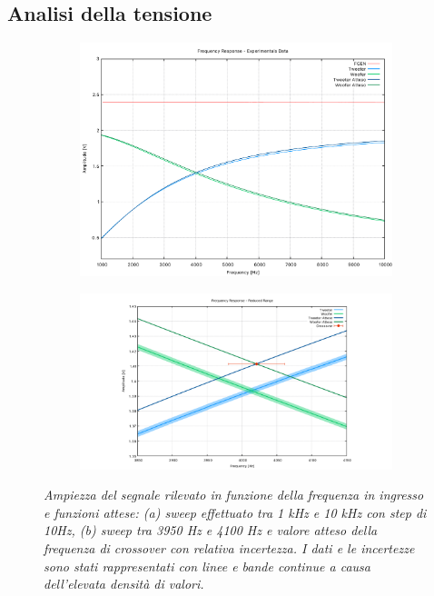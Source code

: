 \documentclass[12pt]{article}
\begin{document}
\
\subsection{Analisi della tensione}
\begin{figure}[!ht]
  \begin{subfigure}{.5\textwidth}
    \centering
    \includegraphics[width=1\linewidth]{../results/CFAmpl.pdf}
    \caption{\textit{}}
  \end{subfigure}%
  \hfill
  \begin{subfigure}{.5\textwidth}
    \centering
    \includegraphics[width=1\linewidth]{../results/CFAmplRR.pdf}
    \caption{\textit{}}
  \end{subfigure}

  \caption{ \textit{Ampiezza del segnale rilevato in funzione della frequenza in ingresso e funzioni attese: (a) sweep effettuato tra 1 kHz e 10 kHz con step di 10Hz, (b) sweep tra 3950 Hz e 4100 Hz e valore atteso della frequenza di crossover con relativa incertezza. I dati e le incertezze sono stati rappresentati con linee e bande continue a causa dell'elevata densità di valori.} }
\end{figure}
\end{document}
